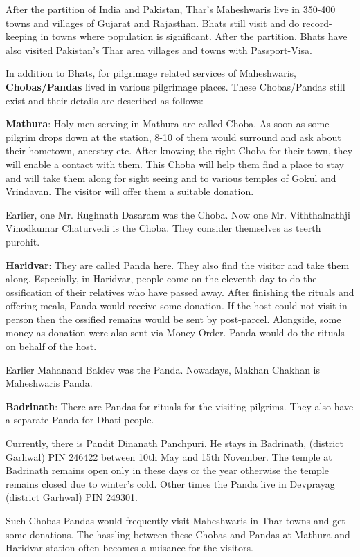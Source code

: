 After the partition of India and Pakistan, Thar's Maheshwaris live in 350-400
towns and villages of Gujarat and Rajasthan. Bhats still visit and do
record-keeping in towns where population is significant. After the partition,
Bhats have also visited Pakistan's Thar area villages and towns with
Passport-Visa. 

In addition to Bhats, for pilgrimage related services of Maheshwaris,
\textbf{Chobas/Pandas} lived in various pilgrimage places. These Chobas/Pandas
still exist and their details are described as follows:

\textbf{Mathura}: Holy men serving in Mathura are called Choba. As soon as some
pilgrim drops down at the station, 8-10 of them would surround and ask about
their hometown, ancestry etc. After knowing the right Choba for their town,
they will enable a contact with them. This Choba will help them find a place to
stay and will take them along for sight seeing and to various temples of Gokul
and Vrindavan. The visitor will offer them a suitable donation.

Earlier, one Mr. Rughnath Dasaram was the Choba. Now one Mr. Viththalnathji
Vinodkumar Chaturvedi is the Choba. They consider themselves as teerth purohit.

\textbf{Haridvar}: They are called Panda here. They also find the visitor and
take them along. Especially, in Haridvar, people come on the eleventh day to do
the ossification of their relatives who have passed away. After finishing the
rituals and offering meals, Panda would receive some donation. If the host
could not visit in person then the ossified remains would be sent by
post-parcel. Alongside, some money as donation were also sent via Money Order.
Panda would do the rituals on behalf of the host.

Earlier Mahanand Baldev was the Panda. Nowadays, Makhan Chakhan is Maheshwaris
Panda.

\textbf{Badrinath}: There are Pandas for rituals for the visiting pilgrims.
They also have a separate Panda for Dhati people.

Currently, there is Pandit Dinanath Panchpuri. He stays in Badrinath, (district
Garhwal) PIN 246422 between 10th May and 15th November. The temple at Badrinath
remains open only in these days or the year otherwise the temple remains closed
due to winter's cold. Other times the Panda live in Devprayag (district
Garhwal) PIN 249301. 

Such Chobas-Pandas would frequently visit Maheshwaris in Thar towns and get
some donations. The hassling between these Chobas and Pandas at Mathura and
Haridvar station often becomes a nuisance for the visitors.

